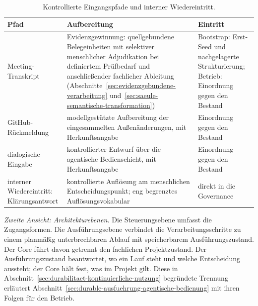 \begin{table}[htbp]
  \centering
  \small
  \begin{tabular}{p{}p{}p{}}
    \hline
    \textbf{Pfad} & \textbf{Aufbereitung} & \textbf{Eintritt} \\
    \hline
    Meeting-Transkript & Evidenzgewinnung: quellgebundene Belegeinheiten
      mit selektiver menschlicher Adjudikation bei definiertem
      Prüfbedarf und anschließender fachlicher Ableitung
      (Abschnitte~\ref{sec:evidenzgebundene-verarbeitung}
      und~\ref{sec:saeule-semantische-transformation}) & Bootstrap: Erst-Seed und
      nachgelagerte Strukturierung; Betrieb: Einordnung gegen den
      Bestand \\
    GitHub-Rückmeldung & modellgestützte Aufbereitung der eingesammelten
      Außenänderungen, mit Herkunftsangabe & Einordnung gegen den
      Bestand \\
    dialogische Eingabe & kontrollierter Entwurf über die agentische
      Bedienschicht, mit Herkunftsangabe & Einordnung gegen den
      Bestand \\
    interner Wiedereintritt: Klärungsantwort & kontrollierte Auflösung
      am menschlichen Entscheidungspunkt; eng begrenztes
      Auflösungsvokabular & direkt in die Governance \\
    \hline
  \end{tabular}
  \caption{Kontrollierte Eingangspfade und interner Wiedereintritt.}
  \label{tab:eingaenge}
\end{table}

\emph{Zweite Ansicht: Architekturebenen.} Die Steuerungsebene
umfasst die Zugangsformen. Die Ausführungsebene verbindet die
Verarbeitungsschritte zu einem planmäßig unterbrechbaren Ablauf
mit speicherbarem Ausführungszustand. Der Core führt davon getrennt
den fachlichen Projektzustand. Der Ausführungszustand beantwortet,
wo ein Lauf steht und welche Entscheidung aussteht; der Core hält
fest, was im Projekt gilt. Diese in
Abschnitt~\ref{sec:durabilitaet-kontinuierliche-nutzung} begründete
Trennung erläutert Abschnitt~\ref{sec:durable-ausfuehrung-agentische-bedienung}
mit ihren Folgen für den Betrieb.

